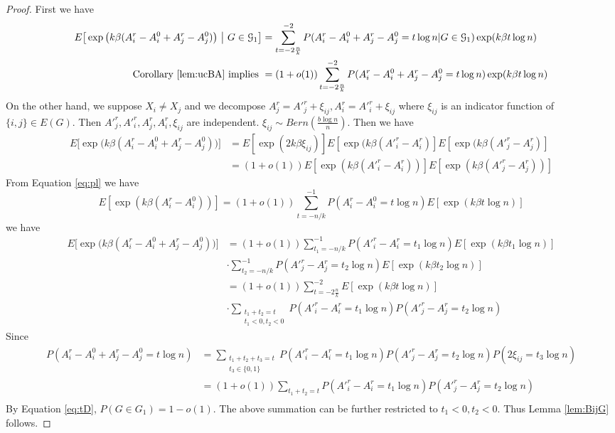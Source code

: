\documentclass{article}
\begin{document}
\begin{proof}
First we have
\begin{align}
E \big[  \exp\big(k\beta (A^r_i - A^0_i + A^r_j - A^0_j) \big) ~\big|~ G\in\mathcal{G}_1 \big] 
&= \sum_{t=-2\frac{n}{k}}^{-2} P(A^r_i - A^0_i + A^r_j - A^0_j = t\log n | G \in \mathcal{G}_1) \exp(k\beta t \log n) \notag \\
\text{ Corollary \ref{lem:ucBA} implies }&= (1+o(1))\sum_{t=-2\frac{n}{k}}^{-2} P(A^r_i - A^0_i + A^r_j - A^0_j = t\log n) \exp(k\beta t \log n)
\end{align}
On the other hand, we suppose $X_i \neq X_j$ and we decompose $A^r_j = A'^r_j + \xi_{ij}, A^r_i = A'^r_i + \xi_{ij}$ where $\xi_{ij}$ is an indicator function of $\{i,j\} \in E(G)$. Then $A'^r_j, A'^r_i, A^r_j, A^r_i, \xi_{ij}$ are independent.
$\xi_{ij} \sim Bern(\frac{b\log n}{n})$.
Then we have
\begin{align*}
E \big[  \exp\big(k\beta (A^r_i - A^0_i + A^r_j - A^0_j ) \big) \big] & = E[\exp(2k\beta \xi_{ij})] E[\exp(k\beta (A'^r_i - A^r_i)]
E[\exp(k\beta (A'^r_j - A^r_j)] \\
& = (1+o(1))E[\exp(k\beta(A'^r_i - A^r_i))] E[\exp(k\beta(A'^r_j - A^r_j))]
\end{align*}
From Equation \eqref{eq:pl} we have
$$
E[\exp(k\beta(A^r_i - A^0_i))] = (1+o(1)) \sum_{t=-n/k}^{-1} P(A^r_i - A^0_i = t \log n)E[\exp(k\beta t \log n)]
$$
we have
\begin{align*}
E \big[  \exp\big(k\beta (A^r_i - A^0_i + A^r_j - A^0_j ) \big) \big] & = (1+o(1))
\sum_{t_1=-n/k}^{-1} P(A'^r_i - A^r_i = t_1 \log n)E[\exp(k\beta t_1 \log n)] \\
& \cdot
\sum_{t_2=-n/k}^{-1} P(A'^r_j - A^r_j = t_2 \log n)E[\exp(k\beta t_2 \log n)] \\
& = (1+o(1))  \sum_{t=-2\frac{n}{k}}^{-2} E[\exp(k\beta t \log n)]\\
& \cdot \sum_{\substack{t_1 + t_2 = t \\ t_1 < 0, t_2 < 0}}
P(A'^r_i - A^r_i = t_1 \log n) P(A'^r_j - A^r_j = t_2\log n)
\end{align*}
Since 
\begin{align*}
P(A^r_i - A^0_i + A^r_j - A^0_j = t\log n)
&= \sum_{\substack{t_1 + t_2 + t_3 = t\\ t_3 \in\{0, 1\}}} P(A'^r_i - A^r_i = t_1 \log n) P(A'^r_j - A^r_j = t_2 \log n) P(2\xi_{ij} = t_3 \log n) \\
&=(1+o(1)) \sum_{t_1 + t_2 = t} P(A'^r_i - A^r_i = t_1 \log n) P(A'^r_j - A^r_j = t_2 \log n)  \\
\end{align*}
By Equation \ref{eq:tD}, $P(G\in G_1) = 1-o(1)$. The above summation can be further restricted to $t_1 < 0, t_2 < 0$. Thus Lemma \ref{lem:BijG} follows. 
\end{proof}


\end{document}
